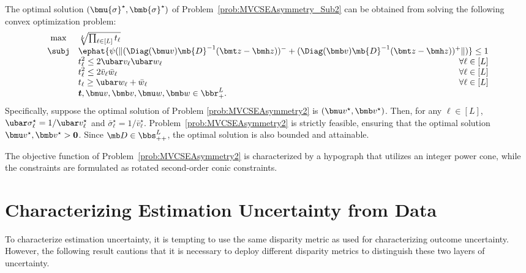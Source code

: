 \documentclass[mnsc, nonblindrev]{informswp}
\newcommand{\1}[1]{\mathds{1}{\left(#1\right)}}
\begin{document}
\begin{theorem}\label{thm:MVCSEAsymmetry_reformulation}
The optimal solution $(\bmu{\sigma}^\star, \bmb{\sigma}^\star)$ of Problem~\eqref{prob:MVCSEAsymmetry_Sub2} can be obtained from solving the following convex optimization problem:
\begin{equation}
\label{prob:MVCSEAsymmetry2}
\begin{array}{clr}
\max & \sqrt[L]{\prod_{\ell \in [L]} t_\ell}  \\
\subj & \multicolumn{2}{l}{ \displaystyle\ephat{\psi(\|(\Diag(\bmu v)\mb{D}^{-1}(\bmt z - \bmh z))^- + (\Diag(\bmb v)\mb{D}^{-1}(\bmt z - \bmh z ))^+\|)} \leq 1} \\
& \displaystyle t_{\ell}^2 \leq 2 \ubar v_{\ell} \ubar w_{\ell} &~\forall \ell \in [L]\\
& \displaystyle t_{\ell}^2 \leq 2 \bar v_{\ell} \bar w_{\ell} &~\forall \ell \in [L]\\
& \displaystyle t_{\ell} \geq \ubar w_{\ell} + \bar w_{\ell} &~\forall \ell \in [L]\\
&\bm t, \bmu v, \bmb v, \bmu w, \bmb w \in \bbr^L_{+}.  
\end{array}
\end{equation}
Specifically, suppose the optimal solution of Problem \eqref{prob:MVCSEAsymmetry2} is $(\bmu v^\star, \bmb v^\star)$. Then, for any $\ell \in [L]$, $\ubar \sigma_{\ell}^\star = 1/\ubar v_{\ell}^\star$ and $\bar \sigma_{\ell}^\star = 1/\bar v_{\ell}^\star$. Problem~\eqref{prob:MVCSEAsymmetry2} is strictly feasible, ensuring that the optimal solution $\bmu v^\star, \bmb v^\star > \bm 0$. Since $\mb D\in \bbs^{L}_{++}$, the optimal solution is also bounded and attainable. 
\end{theorem}

The objective function of Problem~\eqref{prob:MVCSEAsymmetry2} is characterized by a hypograph that utilizes an integer power cone, while the constraints are formulated as rotated second-order conic constraints. 

\section{Characterizing Estimation Uncertainty from Data} \label{sec:EstimatioUncertaintyData}

To characterize estimation uncertainty, it is tempting to use the same disparity metric as used for characterizing outcome uncertainty. However, the following result cautions that it is necessary to deploy different disparity metrics to distinguish these two layers of uncertainty.  
\end{document}
